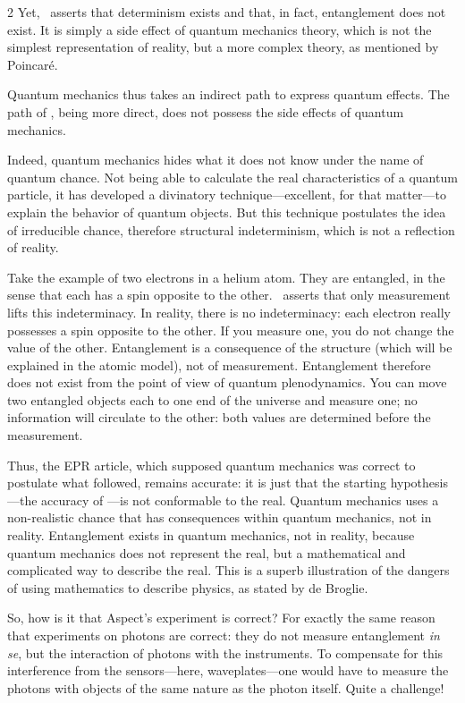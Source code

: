 \begin{multicols}{2}
	Yet, \PQ\ asserts that determinism exists and that, in fact, entanglement does not exist. It is simply a side effect of quantum mechanics theory, which is not the simplest representation of reality, but a more complex theory, as mentioned by Poincaré\cite{poincare:1902:sh}.
	
	Quantum mechanics thus takes an indirect path to express quantum effects. The path of \PQ, being more direct, does not possess the side effects of quantum mechanics.
	
	Indeed, quantum mechanics hides what it does not know under the name of quantum chance. Not being able to calculate the real characteristics of a quantum particle, it has developed a divinatory technique—excellent, for that matter—to explain the behavior of quantum objects. But this technique postulates the idea of irreducible chance, therefore structural indeterminism, which is not a reflection of reality.
	
	Take the example of two electrons in a helium atom. They are entangled, in the sense that each has a spin opposite to the other. \MQ\ asserts that only measurement lifts this indeterminacy. In reality, there is no indeterminacy: each electron really possesses a spin opposite to the other. If you measure one, you do not change the value of the other. Entanglement is a consequence of the structure (which will be explained in the atomic model), not of measurement. Entanglement therefore does not exist from the point of view of quantum plenodynamics. You can move two entangled objects each to one end of the universe and measure one; no information will circulate to the other: both values are determined before the measurement.
	
	Thus, the EPR article, which supposed quantum mechanics was correct to postulate what followed, remains accurate: it is just that the starting hypothesis—the accuracy of \MQ—is not conformable to the real. Quantum mechanics uses a non-realistic chance that has consequences within quantum mechanics, not in reality. Entanglement exists in quantum mechanics, not in reality, because quantum mechanics does not represent the real, but a mathematical and complicated way to describe the real. This is a superb illustration of the dangers of using mathematics to describe physics, as stated by de Broglie\cite{debroglie1976physique}.
	
	So, how is it that Aspect's experiment is correct? For exactly the same reason that experiments on photons are correct: they do not measure entanglement \textit{in se}, but the interaction of photons with the instruments. To compensate for this interference from the sensors—here, waveplates—one would have to measure the photons with objects of the same nature as the photon itself. Quite a challenge!
	

\end{multicols}
